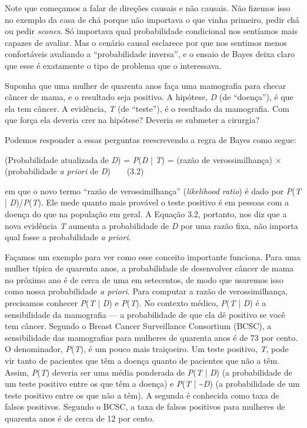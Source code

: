 \documentclass[11pt,a5paper,twoside]{book}
\begin{document}
Note que começamos a falar de direções causais e não causais. Não fizemos isso no exemplo da casa de chá porque não importava o que vinha primeiro, pedir chá ou pedir \textit{scones}. Só importava qual probabilidade condicional nos sentíamos mais capazes de avaliar. Mas o cenário causal esclarece por que nos sentimos menos confortáveis avaliando a “probabilidade inversa”, e o ensaio de Bayes deixa claro que esse é exatamente o tipo de problema que o interessava.

Suponha que uma mulher de quarenta anos faça uma mamografia para checar câncer de mama, e o resultado seja positivo. A hipótese, \textit{D} (de “doença”), é que ela tem câncer. A evidência, \textit{T} (de “teste”), é o resultado da mamografia. Com que força ela deveria crer na hipótese? Deveria se submeter a cirurgia?

Podemos responder a essas perguntas reescrevendo a regra de Bayes como segue:

(Probabilidade atualizada de \textit{D}) = \textit{P}(\textit{D} | \textit{T}) = (razão de verossimilhança) × (probabilidade \textit{a priori} de \textit{D})  (3.2)

em que o novo termo “razão de verossimilhança” (\textit{likelihood ratio}) é dado por \textit{P}(\textit{T} | \textit{D})/\textit{P}(\textit{T}). Ele mede quanto mais provável o teste positivo é em pessoas com a doença do que na população em geral. A Equação 3.2, portanto, nos diz que a nova evidência \textit{T} aumenta a probabilidade de \textit{D} por uma razão fixa, não importa qual fosse a probabilidade \textit{a priori}.

Façamos um exemplo para ver como esse conceito importante funciona. Para uma mulher típica de quarenta anos, a probabilidade de desenvolver câncer de mama no próximo ano é de cerca de uma em setecentos, de modo que usaremos isso como nossa probabilidade \textit{a priori}. Para computar a razão de verossimilhança, precisamos conhecer \textit{P}(\textit{T} | \textit{D}) e \textit{P}(\textit{T}). No contexto médico, \textit{P}(\textit{T} | \textit{D}) é a sensibilidade da mamografia — a probabilidade de que ela dê positivo se você tem câncer. Segundo o Breast Cancer Surveillance Consortium (BCSC), a sensibilidade das mamografias para mulheres de quarenta anos é de 73 por cento. O denominador, \textit{P}(\textit{T}), é um pouco mais traiçoeiro. Um teste positivo, \textit{T}, pode vir tanto de pacientes que têm a doença quanto de pacientes que não a têm. Assim, \textit{P}(\textit{T}) deveria ser uma média ponderada de \textit{P}(\textit{T} | \textit{D}) (a probabilidade de um teste positivo entre os que têm a doença) e \textit{P}(\textit{T} | \textasciitilde{}\textit{D}) (a probabilidade de um teste positivo entre os que não a têm). A segunda é conhecida como taxa de falsos positivos. Segundo o BCSC, a taxa de falsos positivos para mulheres de quarenta anos é de cerca de 12 por cento.
\end{document}
